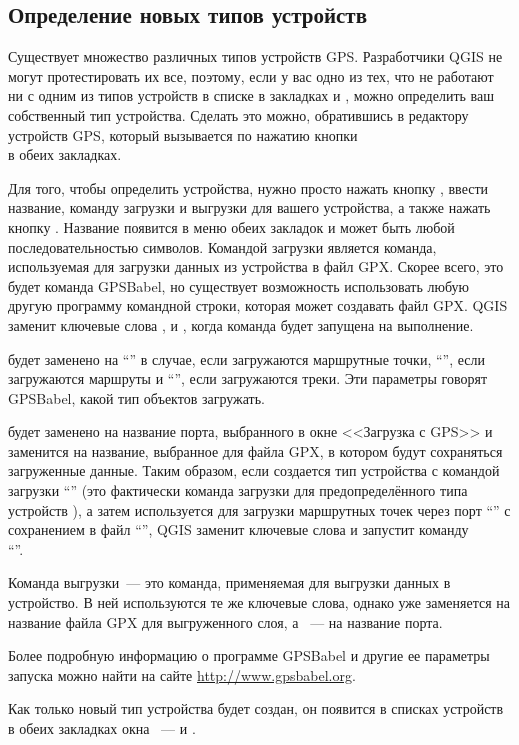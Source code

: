 \subsection{Определение новых типов устройств}\label{sec:Defining-new-device}

Существует множество различных типов устройств GPS. Разработчики QGIS не
могут протестировать их все, поэтому, если у вас одно из тех, что не
работают ни с одним из типов устройств в списке в закладках
 и , можно определить ваш
собственный тип устройства. Сделать это можно, обратившись в редактору
устройств GPS, который вызывается по нажатию кнопки \\
 в обеих закладках.

Для того, чтобы определить устройства, нужно просто нажать кнопку
, ввести название, команду загрузки и выгрузки для
вашего устройства, а также нажать кнопку . Название
появится в меню обеих закладок и может быть любой последовательностью
символов. Командой загрузки является команда, используемая для загрузки
данных из устройства в файл GPX. Скорее всего, это будет команда
GPSBabel, но существует возможность использовать любую другую программу
командной строки, которая может создавать файл GPX. QGIS заменит
ключевые слова ,  и
, когда команда будет запущена на выполнение.

 будет заменено на {}``'' в случае,
если загружаются маршрутные точки, {}``'', если
загружаются маршруты и {}``'', если загружаются треки.
Эти параметры говорят GPSBabel, какой тип объектов загружать.

 будет заменено на название порта, выбранного в окне
<<Загрузка с GPS>> и  заменится на название, выбранное
для файла GPX, в котором будут сохраняться загруженные данные. Таким
образом, если создается тип устройства с командой загрузки
{}``'' (это
фактически команда загрузки для предопределённого типа устройств
), а затем используется
для загрузки маршрутных точек через порт {}``'' с
сохранением в файл {}``'', QGIS заменит ключевые
слова и запустит команду \\
{}``''.

Команда выгрузки~--- это команда, применяемая для выгрузки данных в
устройство. В ней используются те же ключевые слова, однако
 уже заменяется на название файла GPX для выгруженного
слоя, а ~--- на название порта.

Более подробную информацию о программе GPSBabel и другие ее параметры
запуска можно найти на сайте \url{http://www.gpsbabel.org}.

Как только новый тип устройства будет создан, он появится в списках
устройств в обеих закладках окна ~--- 
и .

\FloatBarrier
